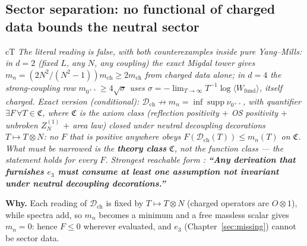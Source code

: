 \subsection{Sector separation: no functional of charged data bounds the neutral sector}
\label{sec:ss}

\begin{claimbox}{cT}
 \emph{The literal reading is false, with both counterexamples
inside pure Yang--Mills: in $d=2$ (fixed $L$, any $N$, any coupling) the exact Migdal tower gives
$m_n=(2N^2/(N^2-1))m_{\mathrm{ch}}\ge2m_{\mathrm{ch}}$ from charged data alone; in $d=4$ the
strong-coupling row $m_{0^{++}}\ge4\sqrt\sigma$ uses $\sigma=-\lim_{T\to\infty}T^{-1}\log\langle W_{\mathrm{fund}}\rangle$, itself
charged. Exact version \LT{} (conditional): $\mathcal D_{\mathrm{ch}}\not\to m_n=\inf\operatorname{supp}\nu_{0^{++}}$, with quantifier
$\exists F\,\forall T\in\mathfrak C$, where $\mathfrak C$ is the axiom class (reflection
positivity $+$ OS positivity $+$ unbroken $Z_N^{(1)}$ $+$ area law) closed under neutral decoupling
decorations $T\mapsto T\otimes N$: no $F$ that is positive anywhere obeys
$F(\mathcal D_{\mathrm{ch}}(T))\le m_n(T)$ on $\mathfrak C$. What must be narrowed is the
\textbf{theory class} $\mathfrak C$, not the function class --- the statement holds for \emph{every}
$F$. Strongest reachable form \LT: \textbf{``Any derivation that furnishes $e_3$ must consume at least
one assumption not invariant under neutral decoupling decorations.''}}
\end{claimbox}

\textbf{Why.} Each reading of $\mathcal D_{\mathrm{ch}}$ is fixed by $T\mapsto T\otimes N$ (charged
operators are $O\otimes1$), while spectra add, so $m_n$ becomes a minimum and a free massless scalar gives
$m_n=0$: hence $F\le0$ wherever evaluated, and $e_3$ (Chapter~\ref{sec:missing}) cannot be sector data.
